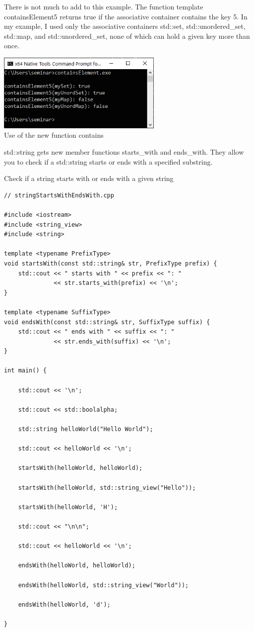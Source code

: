 There is not much to add to this example. The function template containsElement5 returns true if the associative container contains the key 5. In my example, I used only the associative containers std::set, std::unordered\_set, std::map, and std::unordered\_set, none of which can hold a given key more than once.

\begin{center}
\includegraphics[width=0.6\textwidth]{content/3/chapter5/images/14.png}\\
Use of the new function contains
\end{center}


std::string gets new member functions starts\_with and ends\_with. They allow you to check if a std::string starts or ends with a specified substring.

\noindent
Check if a string starts with or ends with a given string
\begin{lstlisting}[style=styleCXX]
// stringStartsWithEndsWith.cpp

#include <iostream>
#include <string_view>
#include <string>

template <typename PrefixType>
void startsWith(const std::string& str, PrefixType prefix) {
	std::cout << " starts with " << prefix << ": "
			  << str.starts_with(prefix) << '\n';
}

template <typename SuffixType>
void endsWith(const std::string& str, SuffixType suffix) {
	std::cout << " ends with " << suffix << ": "
			  << str.ends_with(suffix) << '\n';
}

int main() {

	std::cout << '\n';
	
	std::cout << std::boolalpha;
	
	std::string helloWorld("Hello World");
	
	std::cout << helloWorld << '\n';
	
	startsWith(helloWorld, helloWorld);
	
	startsWith(helloWorld, std::string_view("Hello"));
	
	startsWith(helloWorld, 'H');
	
	std::cout << "\n\n";
	
	std::cout << helloWorld << '\n';
	
	endsWith(helloWorld, helloWorld);
	
	endsWith(helloWorld, std::string_view("World"));
	
	endsWith(helloWorld, 'd');

}
\end{lstlisting}


